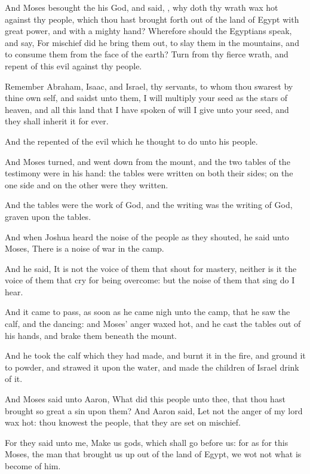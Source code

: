 \verse And Moses besought the \LORD his God, and said, \LORD, why doth
thy wrath wax hot against thy people, which thou hast brought forth
out of the land of Egypt with great power, and with a mighty hand?
\verse Wherefore should the Egyptians speak, and say, For mischief did
he bring them out, to slay them in the mountains, and to consume them
from the face of the earth? Turn from thy fierce wrath, and repent of
this evil against thy people.

\verse Remember Abraham, Isaac, and Israel, thy servants, to whom thou
swarest by thine own self, and saidst unto them, I will multiply your
seed as the stars of heaven, and all this land that I have spoken of
will I give unto your seed, and they shall inherit it for ever.

\verse And the \LORD repented of the evil which he thought to do unto
his people.

\verse And Moses turned, and went down from the mount, and the two
tables of the testimony were in his hand: the tables were written on
both their sides; on the one side and on the other were they written.

\verse And the tables were the work of God, and the writing was the
writing of God, graven upon the tables.

\verse And when Joshua heard the noise of the people as they shouted,
he said unto Moses, There is a noise of war in the camp.

\verse And he said, It is not the voice of them that shout for mastery,
neither is it the voice of them that cry for being overcome: but the
noise of them that sing do I hear.

\verse And it came to pass, as soon as he came nigh unto the camp, that
he saw the calf, and the dancing: and Moses' anger waxed hot, and he
cast the tables out of his hands, and brake them beneath the mount.

\verse And he took the calf which they had made, and burnt it in the
fire, and ground it to powder, and strawed it upon the water, and made
the children of Israel drink of it.

\verse And Moses said unto Aaron, What did this people unto thee, that
thou hast brought so great a sin upon them?  \verse And Aaron said, Let
not the anger of my lord wax hot: thou knowest the people, that they
are set on mischief.

\verse For they said unto me, Make us gods, which shall go before us:
for as for this Moses, the man that brought us up out of the land of
Egypt, we wot not what is become of him.

